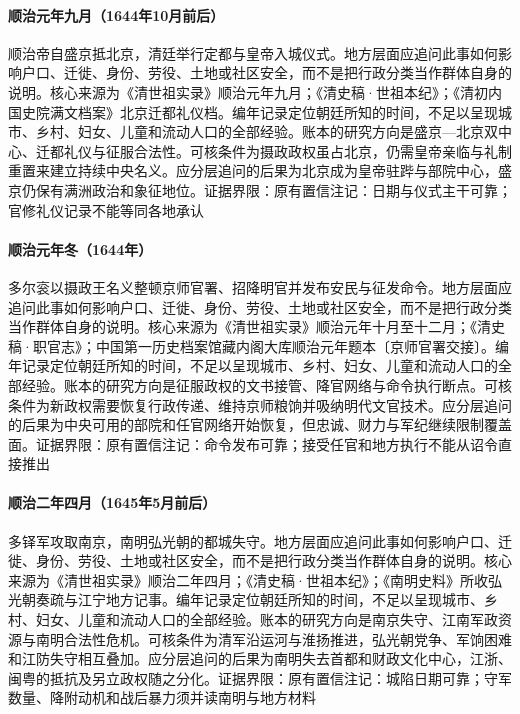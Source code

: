 \hypertarget{social:EQ-1644-SHUNZHI-BEIJING}{}\paragraph{顺治元年九月（1644年10月前后）}顺治帝自盛京抵北京，清廷举行定都与皇帝入城仪式。地方层面应追问此事如何影响户口、迁徙、身份、劳役、土地或社区安全，而不是把行政分类当作群体自身的说明。核心来源为《清世祖实录》顺治元年九月；《清史稿·世祖本纪》；《清初内国史院满文档案》北京迁都礼仪档。编年记录定位朝廷所知的时间，不足以呈现城市、乡村、妇女、儿童和流动人口的全部经验。账本的研究方向是盛京—北京双中心、迁都礼仪与征服合法性。可核条件为摄政政权虽占北京，仍需皇帝亲临与礼制重置来建立持续中央名义。应分层追问的后果为北京成为皇帝驻跸与部院中心，盛京仍保有满洲政治和象征地位。证据界限：原有置信注记：日期与仪式主干可靠；官修礼仪记录不能等同各地承认
\hypertarget{social:EQ-1644-REGENT-ORDERS}{}\paragraph{顺治元年冬（1644年）}多尔衮以摄政王名义整顿京师官署、招降明官并发布安民与征发命令。地方层面应追问此事如何影响户口、迁徙、身份、劳役、土地或社区安全，而不是把行政分类当作群体自身的说明。核心来源为《清世祖实录》顺治元年十月至十二月；《清史稿·职官志》；中国第一历史档案馆藏内阁大库顺治元年题本〔京师官署交接〕。编年记录定位朝廷所知的时间，不足以呈现城市、乡村、妇女、儿童和流动人口的全部经验。账本的研究方向是征服政权的文书接管、降官网络与命令执行断点。可核条件为新政权需要恢复行政传递、维持京师粮饷并吸纳明代文官技术。应分层追问的后果为中央可用的部院和任官网络开始恢复，但忠诚、财力与军纪继续限制覆盖面。证据界限：原有置信注记：命令发布可靠；接受任官和地方执行不能从诏令直接推出
\hypertarget{social:EQ-1645-NANJING-TAKEN}{}\paragraph{顺治二年四月（1645年5月前后）}多铎军攻取南京，南明弘光朝的都城失守。地方层面应追问此事如何影响户口、迁徙、身份、劳役、土地或社区安全，而不是把行政分类当作群体自身的说明。核心来源为《清世祖实录》顺治二年四月；《清史稿·世祖本纪》；《南明史料》所收弘光朝奏疏与江宁地方记事。编年记录定位朝廷所知的时间，不足以呈现城市、乡村、妇女、儿童和流动人口的全部经验。账本的研究方向是南京失守、江南军政资源与南明合法性危机。可核条件为清军沿运河与淮扬推进，弘光朝党争、军饷困难和江防失守相互叠加。应分层追问的后果为南明失去首都和财政文化中心，江浙、闽粤的抵抗及另立政权随之分化。证据界限：原有置信注记：城陷日期可靠；守军数量、降附动机和战后暴力须并读南明与地方材料
